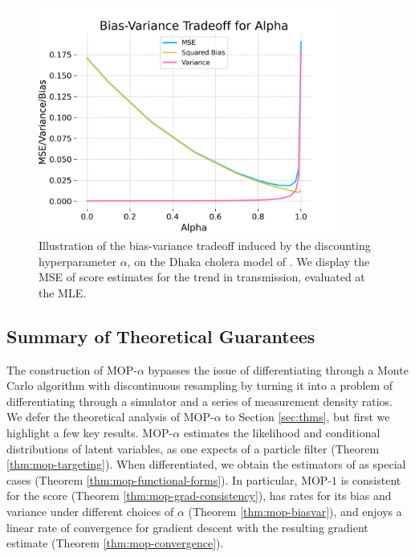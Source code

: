 \documentclass[11pt]{article}
\newcommand\arxiv[2]{#1} %
\begin{document}
\begin{figure}[ht!]
  \centering
    \includegraphics[width=\arxiv{10cm}{\textwidth/3}]{../imgs/095/biasvar.png}
    \caption{Illustration of the bias-variance tradeoff induced by the discounting hyperparameter $\alpha$, on the Dhaka cholera model of \cite{king08}. We display the MSE of score estimates for the trend in transmission, evaluated at the MLE.}
    \label{fig:biasvar}
\end{figure}

\subsection{Summary of Theoretical Guarantees}

The construction of MOP-$\alpha$ bypasses the issue of differentiating through a Monte Carlo algorithm with discontinuous resampling by turning it into a problem of differentiating through a simulator and a series of measurement density ratios.
We defer the theoretical analysis of MOP-$\alpha$ to Section \ref{sec:thms}, but first we highlight a few key results.
MOP-$\alpha$ estimates the likelihood and conditional distributions of latent variables, as one expects of a particle filter (Theorem \ref{thm:mop-targeting}).
When differentiated, we obtain the estimators of \cite{poyiadjis11, scibior21, naesseth18} as special cases (Theorem \ref{thm:mop-functional-forms}).
In particular, MOP-$1$ is consistent for the score (Theorem \ref{thm:mop-grad-consistency}), has rates for its bias and variance under different choices of $\alpha$ (Theorem \ref{thm:mop-biasvar}), and enjoys a linear rate of convergence for gradient descent with the resulting gradient estimate (Theorem \ref{thm:mop-convergence}).  
\end{document}
